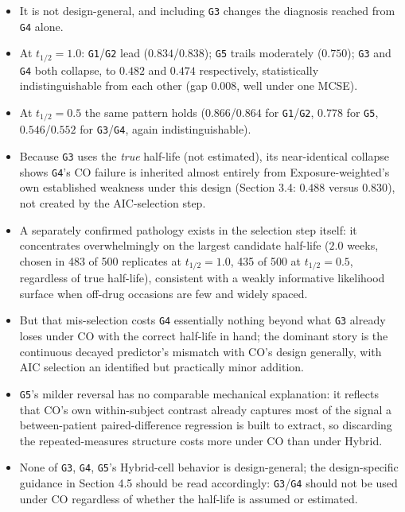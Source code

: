 \documentclass[
  11pt,
]{article}
\providecommand{\tightlist}{%
  \setlength{\itemsep}{0pt}\setlength{\parskip}{0pt}}
\begin{document}
\begin{itemize}
\tightlist
\item
  It is not design-general, and including \texttt{G3} changes the diagnosis
  reached from \texttt{G4} alone.
\item
  At \(t_{1/2}=1.0\): \texttt{G1}/\texttt{G2} lead (\(0.834\)/\(0.838\)); \texttt{G5} trails
  moderately (\(0.750\)); \texttt{G3} and \texttt{G4} both collapse, to \(0.482\) and
  \(0.474\) respectively, statistically indistinguishable from each
  other (gap \(0.008\), well under one MCSE).
\item
  At \(t_{1/2}=0.5\) the same pattern holds (\(0.866\)/\(0.864\) for
  \texttt{G1}/\texttt{G2}, \(0.778\) for \texttt{G5}, \(0.546\)/\(0.552\) for \texttt{G3}/\texttt{G4}, again
  indistinguishable).
\item
  Because \texttt{G3} uses the \emph{true} half-life (not estimated), its
  near-identical collapse shows \texttt{G4}'s CO failure is inherited almost
  entirely from Exposure-weighted's own established weakness under
  this design (Section 3.4: \(0.488\) versus \(0.830\)), not created by
  the AIC-selection step.
\item
  A separately confirmed pathology exists in the selection step
  itself: it concentrates overwhelmingly on the largest candidate
  half-life (\(2.0\) weeks, chosen in 483 of 500 replicates at
  \(t_{1/2}=1.0\), 435 of 500 at \(t_{1/2}=0.5\), regardless of true
  half-life), consistent with a weakly informative likelihood surface
  when off-drug occasions are few and widely spaced.
\item
  But that mis-selection costs \texttt{G4} essentially nothing beyond what
  \texttt{G3} already loses under CO with the correct half-life in hand; the
  dominant story is the continuous decayed predictor's mismatch with
  CO's design generally, with AIC selection an identified but
  practically minor addition.
\item
  \texttt{G5}'s milder reversal has no comparable mechanical explanation: it
  reflects that CO's own within-subject contrast already captures
  most of the signal a between-patient paired-difference regression
  is built to extract, so discarding the repeated-measures structure
  costs more under CO than under Hybrid.
\item
  None of \texttt{G3}, \texttt{G4}, \texttt{G5}'s Hybrid-cell behavior is design-general;
  the design-specific guidance in Section 4.5 should be read
  accordingly: \texttt{G3}/\texttt{G4} should not be used under CO regardless of
  whether the half-life is assumed or estimated.
\end{itemize}
\end{document}
